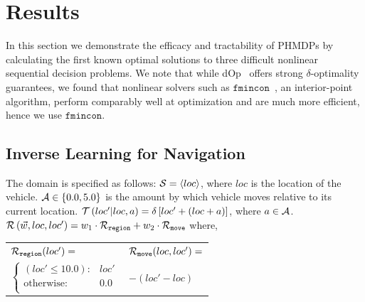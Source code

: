 \section{Results}
\label{sec:results}

In this section we demonstrate the efficacy and tractability of PHMDPs by calculating the first known optimal solutions to three difficult nonlinear sequential decision problems. We note that while dOp~\cite{Gao2013} offers strong {\footnotesize $ \delta $}-optimality guarantees, we found that nonlinear solvers such as $ \mathtt{fmincon} $~\cite{MATLAB_2010}, an interior-point algorithm, perform comparably well at optimization and are much more efficient, hence we use $ \mathtt{fmincon} $.

\subsection{Inverse Learning for Navigation}
\label{sec:results_navigation}

The domain is specified as follows: {\footnotesize $ \mathcal{S} = \left\langle loc \right\rangle$}, where $ loc $ is the location of the vehicle. {\footnotesize $ \mathcal{A} \in \left\lbrace 0.0, 5.0 \right\rbrace $} is the amount by which vehicle moves relative to its current location. {\footnotesize $ \mathcal{T}\left( loc' | loc, a \right) = \delta \left[ loc' + (loc + a) \right] $}, where {\footnotesize $ a \in \mathcal{A} $}. {\footnotesize $ \mathcal{R}\left(\vec{w}, loc, loc'\right) = w_1 \cdot \mathcal{R}_{\mathtt{region}} + w_2 \cdot \mathcal{R}_{\mathtt{move}} $} where,

{\footnotesize 
    \abovedisplayskip=10pt
    \belowdisplayskip=0pt
    \renewcommand{\arraystretch}{1.5}
    \begin{tabular}{ll}    
        $ \mathcal{R}_{\mathtt{region}}(loc') = $ &  $ \mathcal{R}_{\mathtt{move}}(loc, loc') =  $ \\
        \qquad $ \begin{cases}
        (loc' \leq 10.0 ) : 				& loc' \\
        \text{otherwise} : 					& 0.0 \\
        \end{cases} $ 						& \qquad $ - (loc' - loc)  $\\
    \end{tabular}
} 

